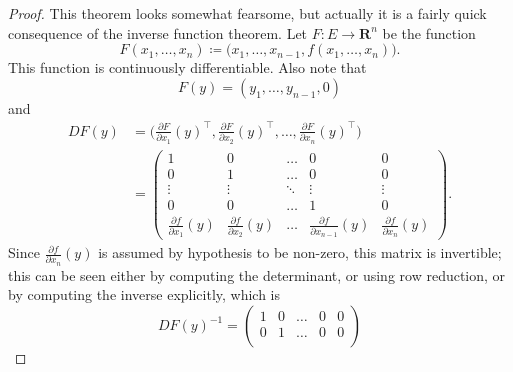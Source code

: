 \begin{proof}
    This theorem looks somewhat fearsome, but actually it is a fairly quick consequence of the inverse function theorem.
    Let \(F : E \to \mathbf{R}^n\) be the function
    \[
        F(x_1, \dots, x_n) \coloneqq \big(x_1, \dots, x_{n - 1}, f(x_1, \dots, x_n)\big).
    \]
    This function is continuously differentiable.
    Also note that
    \[
        F(y) = (y_1, \dots, y_{n - 1}, 0)
    \]
    and
    \begin{align*}
        D F(y) & = \bigg(\frac{\partial F}{\partial x_1}(y)^\top, \frac{\partial F}{\partial x_2}(y)^\top, \dots, \frac{\partial F}{\partial x_n}(y)^\top\bigg) \\
               & = \begin{pmatrix}
            1                                  & 0                                  & \dots  & 0                                        & 0                                  \\
            0                                  & 1                                  & \dots  & 0                                        & 0                                  \\
            \vdots                             & \vdots                             & \ddots & \vdots                                   & \vdots                             \\
            0                                  & 0                                  & \dots  & 1                                        & 0                                  \\
            \frac{\partial f}{\partial x_1}(y) & \frac{\partial f}{\partial x_2}(y) & \dots  & \frac{\partial f}{\partial x_{n - 1}}(y) & \frac{\partial f}{\partial x_n}(y)
        \end{pmatrix}.
    \end{align*}
    Since \(\frac{\partial f}{\partial x_n}(y)\) is assumed by hypothesis to be non-zero, this matrix is invertible;
    this can be seen either by computing the determinant, or using row reduction, or by computing the inverse explicitly, which is
    \[
        D F(y)^{-1} = \begin{pmatrix}
            1                                       & 0                                       & \dots  & 0                                             & 0      \\
            0                                       & 1                                       & \dots  & 0                                             & 0      \\

\end{pmatrix}\]
\end{proof}
